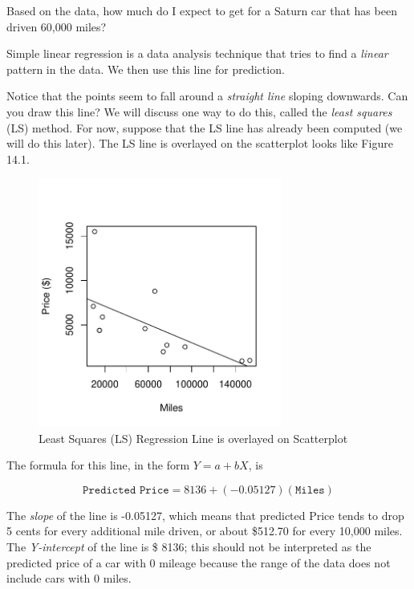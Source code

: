 \documentclass[11pt, chapterprefix=true]{scrbook}\usepackage[]{graphicx}\usepackage[]{color}
\begin{document}
Based on the data, how much do I expect to get for a Saturn car that has been driven 60,000 miles?

Simple linear regression is a data analysis technique that tries to find a \textit{linear} pattern in the data.  We then use this line for prediction.

Notice that the points seem to fall around a \textit{straight line} sloping downwards.  Can you draw this line?  We will discuss one way to do this, called the \textit{least squares} (LS) method.  For now, suppose that the LS line has already been computed (we will do this later).  The LS line is overlayed on the scatterplot looks like Figure 14.1.

\begin{figure}[ht]
\centering
\caption{Least Squares (LS) Regression Line is overlayed on Scatterplot}


{\centering \includegraphics[width=8cm]{figure/LBL14b-1} 

}



\end{figure}

The formula for this line, in the form $Y= a + bX$,  is 

\begin{equation*}
  \texttt{Predicted Price} = 8136 + (-0.05127)(\texttt{Miles})
\end{equation*}

The \textit{slope} of the line is -0.05127, which means that predicted Price tends to drop 5 cents for every additional mile driven, or about \$512.70 for every 10,000 miles. The \textit{Y-intercept} of the line is \$ 8136; this should not be interpreted as the predicted price of a car with 0 mileage because the range of the data does not include cars with 0 miles.  
\end{document}
